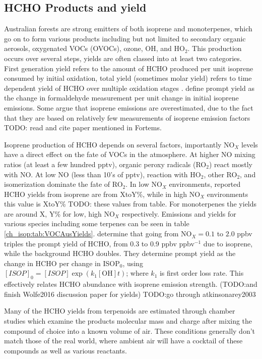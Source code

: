   \subsection{HCHO Products and yield}
    Australian forests are strong emitters of both isoprene and monoterpenes, which go on to form various products including but not limited to secondary organic aerosols, oxygenated VOCs (OVOCs), ozone, OH, and HO$_2$.
    This production occurs over several steps, yields are often classed into at least two categories.
    First generation yield refers to the amount of HCHO produced per unit isoprene consumed by initial oxidation, total yield (sometimes molar yield) refers to time dependent yield of HCHO over multiple oxidation stages \citep{Wolfe2016}.
    \citet{Wolfe2016} define prompt yield as the change in formaldehyde measurement per unit change in initial isoprene emissions.
    Some argue that isoprene emissions are overestimated, due to the fact that they are based on relatively few measurements of isoprene emission factors \citep{Winters2009, FortemsCheiney2012} TODO: read and cite paper mentioned in Fortems.
    
    Isoprene production of HCHO depends on several factors, importantly NO$_X$ levels have a direct effect on the fate of VOCs in the atmosphere.
    At higher NO mixing ratios (at least a few hundred pptv), organic peroxy radicals (RO$_2$) react mostly with NO. 
    At low NO (less than 10's of pptv), reaction with HO$_2$, other RO$_2$, and isomerization dominate the fate of RO$_2$.
    In low NO$_X$ environments, reported HCHO yields from isoprene are from XtoY\%, while in high NO$_X$ environments this value is XtoY\% TODO: these values from table.
    For monoterpenes the yields are around X, Y\% for low, high NO$_X$ respectively.
    Emissions and yields for various species including some terpenes can be seen in table \ref{ch_isop:tab:VOCAusYields}.
    \citet{Wolfe2016} determine that going from NO$_X = 0.1$ to $2.0$ ppbv triples the prompt yield of HCHO, from 0.3 to 0.9 ppbv ppbv$^{-1}$ due to isoprene, while the background HCHO doubles.
    They determine prompt yield as the change in HCHO per change in ISOP$_0$, using $[ISOP]_0=[ISOP]\exp(k_1[\mathrm{OH}]t)$; where $k_1$ is first order loss rate.
    This effectively relates HCHO abundance with isoprene emission strength.
    (TODO:and finish Wolfe2016 discussion paper for yields)
    TODO:go through atkinsonarey2003
    
    Many of the HCHO yields from terpenoids are estimated through chamber studies which examine the products molecular mass and charge after mixing the compound of choice into a known volume of air.
    These conditions generally don't match those of the real world, where ambient air will have a cocktail of these compounds as well as various reactants.
    
